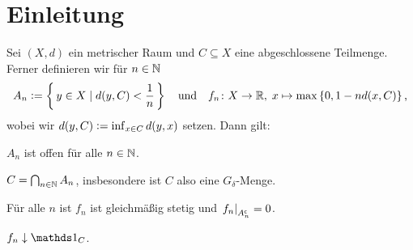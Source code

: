\documentclass[../main/main.tex]{subfiles}
\begin{document}
	
	\section{Einleitung}
	
	\begin{Lemma}
		Sei $(X, d)$ ein metrischer Raum und $C \subseteq X$ eine abgeschlossene Teilmenge. Ferner definieren wir für $n \in \mathbb{N}$
		$$ A_n \vcentcolon = \left\{\, y \in X \; | \; d(y, C) < \frac{1}{n} \,\right\} \quad \text{und} \quad f_n \colon X \to \mathbb{R}, \; x \mapsto \max \left\{0, 1-n d(x, C)\right\}  \text{,}$$
		wobei wir $d(y, C) \vcentcolon = \inf_{x \in C} d(y, x)$ setzen.
		Dann gilt:
		\begin{enumeratethm}
			\item $A_n$ ist offen für alle $n \in \mathbb{N}$.
			\item $C = \bigcap_{n \in \mathbb{N}} A_n$, insbesondere ist $C$ also eine $G_\delta$-Menge.
			\item Für alle $n$ ist $f_n$ ist gleichmäßig stetig und $\left.f_n\right|_{A_n^\mathsf{c}} = 0$.
			\item $f_n \convdown \indfct_C$.
		\end{enumeratethm}
	\end{Lemma}
	
\end{document}
